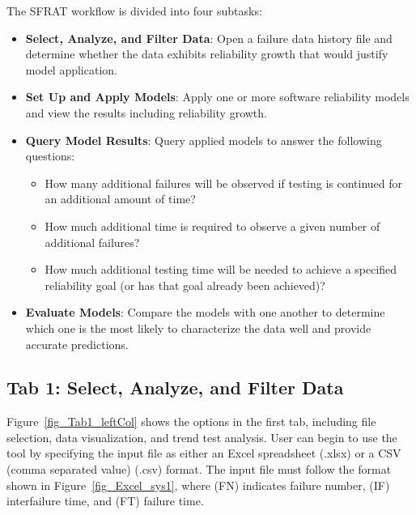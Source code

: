 \documentclass[journal]{IEEEtran}
\begin{document}
The SFRAT workflow is divided into four subtasks:
\begin{itemize}
\item{\textbf{Select, Analyze, and Filter Data}: Open a failure data history file and determine whether the data exhibits reliability growth that would justify model application.}
\item{\textbf{Set Up and Apply Models}: Apply one or more software reliability models and view the results including reliability growth.}
\item{\textbf{Query Model Results}: Query applied models to answer the following questions:
\begin{itemize}
\item{How many additional failures will be observed if testing is continued for an additional amount of time?}
\item{How much additional time is required to observe a given number of additional failures?}
\item{How much additional testing time will be needed to achieve a specified reliability goal (or has that goal already been achieved)?}
\end{itemize}}
\item{\textbf{Evaluate Models}: Compare the models with one another to determine which one is the most likely to characterize the data well and provide accurate predictions.}
\end{itemize}


\subsection{Tab 1: Select, Analyze, and Filter Data}\label{tab1}
Figure~\ref{fig_Tab1_leftCol} shows the options in the first tab, including file selection, data visualization, and trend test analysis. User can begin to use the tool by specifying the input file as either an Excel spreadsheet (.xlsx) or a CSV (comma separated value) (.csv) format. The input file must follow the format shown in Figure~\ref{fig_Excel_sys1}, where (FN) indicates failure number, (IF) interfailure time, and (FT) failure time.
\end{document}
